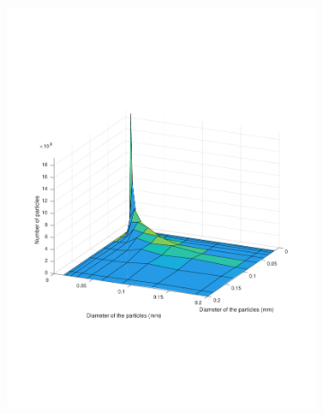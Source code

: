 \documentclass[preprint,11pt,authoryear]{elsarticle}
\begin{document}
\begin{figure}
\begin{subfigure}{.5\textwidth}
\includegraphics[scale=0.45]{rslts-PBM_75s_psd.pdf}
\caption{}
\label{fig:75s}
\end{subfigure}\hfill
\begin{subfigure}{.5\textwidth}


\end{subfigure}
\end{figure}
\end{document}
